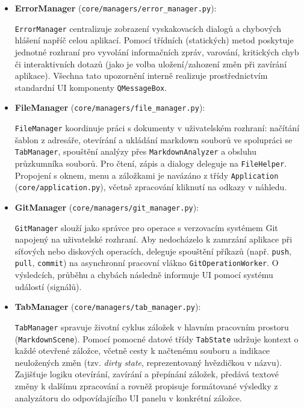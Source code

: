 \documentclass[12pt, a4paper]{article}
\begin{document}
\begin{itemize}
\begin{itemize}
        \item \textbf{ErrorManager} (\texttt{core/managers/error\_manager.py}):

        \texttt{ErrorManager} centralizuje zobrazení vyskakovacích dialogů a chybových hlášení napříč celou aplikací. 
        Pomocí třídních (statických) metod poskytuje jednotné rozhraní pro vyvolání informačních zpráv, 
        varování, kritických chyb či interaktivních dotazů (jako je volba uložení/zahození změn při zavírání aplikace). 
        Všechna tato upozornění interně realizuje prostřednictvím standardní UI komponenty \texttt{QMessageBox}.

        \item \textbf{FileManager} (\texttt{core/managers/file\_manager.py}):

        \texttt{FileManager} koordinuje práci s dokumenty v uživatelském rozhraní: 
        načítání šablon z adresáře, otevírání a ukládání markdown souborů ve spolupráci se \texttt{TabManager}, 
        spouštění analýzy přes \texttt{MarkdownAnalyzer} a obsluhu průzkumníka souborů. Pro čtení, zápis a 
        dialogy deleguje na \texttt{FileHelper}. Propojení s oknem, menu a záložkami je navázáno z třídy 
        \texttt{Application} (\texttt{core/application.py}), včetně zpracování kliknutí na odkazy v náhledu.

        \item \textbf{GitManager} (\texttt{core/managers/git\_manager.py}):

        \texttt{GitManager} slouží jako správce pro operace s verzovacím systémem Git napojený na uživatelské rozhraní. 
        Aby nedocházelo k zamrzání aplikace při síťových nebo diskových operacích, 
        deleguje spouštění příkazů (např. \texttt{push}, \texttt{pull}, \texttt{commit}) na asynchronní pracovní vlákno 
        \texttt{GitOperationWorker}. O výsledcích, průběhu a chybách následně informuje UI pomocí systému událostí (signálů).

        \item \textbf{TabManager} (\texttt{core/managers/tab\_manager.py}):

        \texttt{TabManager} spravuje životní cyklus záložek v hlavním pracovním prostoru (\texttt{MarkdownScene}). 
        Pomocí pomocné datové třídy \texttt{TabState} udržuje kontext o každé otevřené záložce, včetně cesty 
        k načtenému souboru a indikace neuložených změn (tzv. \textit{dirty state}, reprezentovaný hvězdičkou v názvu). 
        Zajišťuje logiku otevírání, zavírání a přepínání záložek, předává textové změny k dalšímu zpracování a 
        rovněž propisuje formátované výsledky z analyzátoru do odpovídajícího UI panelu v konkrétní záložce.
    \end{itemize}


\end{itemize}
\end{document}
